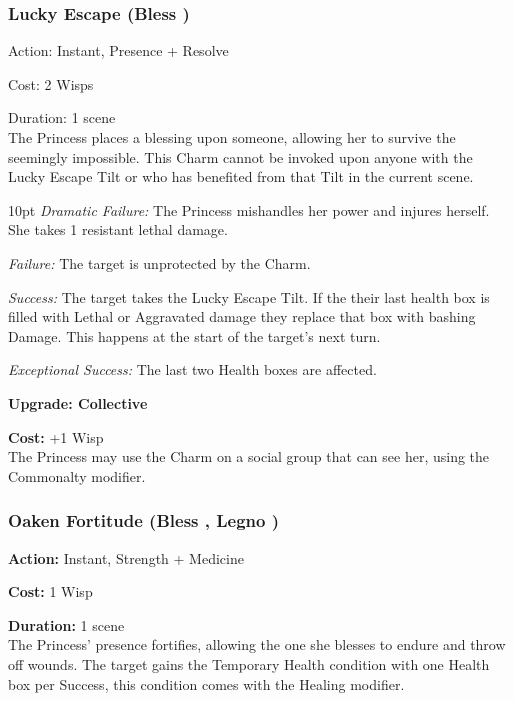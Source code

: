 \subsubsection*{Lucky Escape (Bless \textbullet\textbullet\textbullet)}

Action: Instant, Presence + Resolve

Cost: 2 Wisps

Duration: 1 scene \\

\noindent The Princess places a blessing upon someone, allowing her to survive the seemingly impossible. This Charm cannot be invoked upon anyone with the Lucky Escape Tilt or who has benefited from that Tilt in the current scene. 

\begin{myindentpar}{10pt}    \emph{Dramatic Failure:} The Princess mishandles her power and injures herself. She takes 1 resistant lethal damage.

\emph{Failure:} The target is unprotected by the Charm. 

\emph{Success:} The target takes the Lucky Escape Tilt. If the their last health box is filled with Lethal or Aggravated damage they replace that box with bashing Damage. This happens at the start of the target's next turn. 

\emph{Exceptional Success:} The last two Health boxes are affected.

\textbf{Upgrade: Collective}

\noindent \textbf{Cost:} +1 Wisp \\

The Princess may use the Charm on a social group that can see her, using the Commonalty modifier. 

\end{myindentpar}


\subsubsection*{Oaken Fortitude (Bless \textbullet\textbullet\textbullet, Legno \textbullet)}

\noindent \textbf{Action:} Instant, Strength + Medicine

\noindent \textbf{Cost:} 1 Wisp

\noindent \textbf{Duration:} 1 scene \\

\noindent The Princess' presence fortifies, allowing the one she blesses to endure and throw off wounds. The target gains the Temporary Health condition with one Health box per Success, this condition comes with the Healing modifier. 

